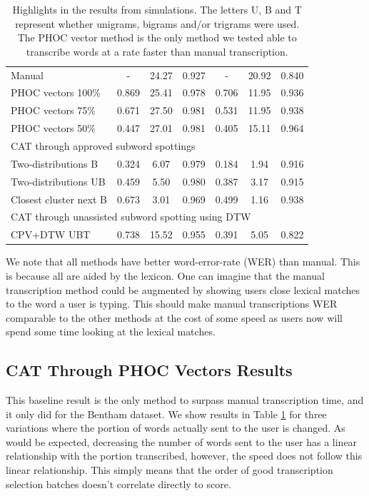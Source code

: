\documentclass[ms,electronic,twosidetoc,letterpaper,chaptercenter,parttop,lof,lot]{byumsphd}
\begin{document}
\begin{table}
\begin{tabular}{| l | c  c  c | c c c |}
  Manual             & -   & 24.27 & 0.927 &  -   & 20.92 & 0.840 \\
  PHOC vectors 100\% & 0.869 & 25.41 & 0.978 &  0.706 & 11.95 & 0.936 \\
  PHOC vectors 75\%  & 0.671 & 27.50 & 0.981 &  0.531 & 11.95 & 0.938 \\
  PHOC vectors 50\%  & 0.447 & 27.01 & 0.981 &  0.405 & 15.11 & 0.964 \\
  \hline	
  \multicolumn{7}{|l|}{CAT through approved subword spottings} \\
  Two-distributions B & 0.324 & 6.07 & 0.979 & 0.184 & 1.94 & 0.916 \\
  Two-distributions UB & 0.459 & 5.50 & 0.980 & 0.387 & 3.17 & 0.915 \\
  Closest cluster next B & 0.673 & 3.01 & 0.969 & 0.499 & 1.16 & 0.938 \\
  \hline	
  \multicolumn{7}{|l|}{CAT through unassisted subword spotting using DTW} \\
  CPV+DTW UBT & 0.738 & 15.52 & 0.955 & 0.391 & 5.05 & 0.822 \\
  \hline  
\end{tabular}
\caption{Highlights in the results from simulations. The letters U, B and T represent whether unigrams, bigrams and/or trigrams were used. The PHOC vector method is the only method we tested able to transcribe words at a rate faster than manual transcription.}
\label{tab:finalresults}
\end{table}

We note that all methods have better word-error-rate (WER) than manual. This is because all are aided by the lexicon. One can imagine that the manual transcription method could be augmented by showing users close lexical matches to the word a user is typing. This should make manual transcriptions WER comparable to the other methods at the cost of some speed as users now will spend some time looking at the lexical matches.


\subsection{CAT Through PHOC Vectors Results}
This baseline result is the only method to surpass manual transcription time, and it only did for the Bentham dataset. We show results in Table \ref{tab:finalresults} for three variations where the portion of words actually sent to the user is changed. As would be expected, decreasing the number of words sent to the user has a linear relationship with the portion transcribed, however, the speed does not follow this linear relationship. This simply means that the order of good transcription selection batches doesn't correlate directly to score.
\end{document}
